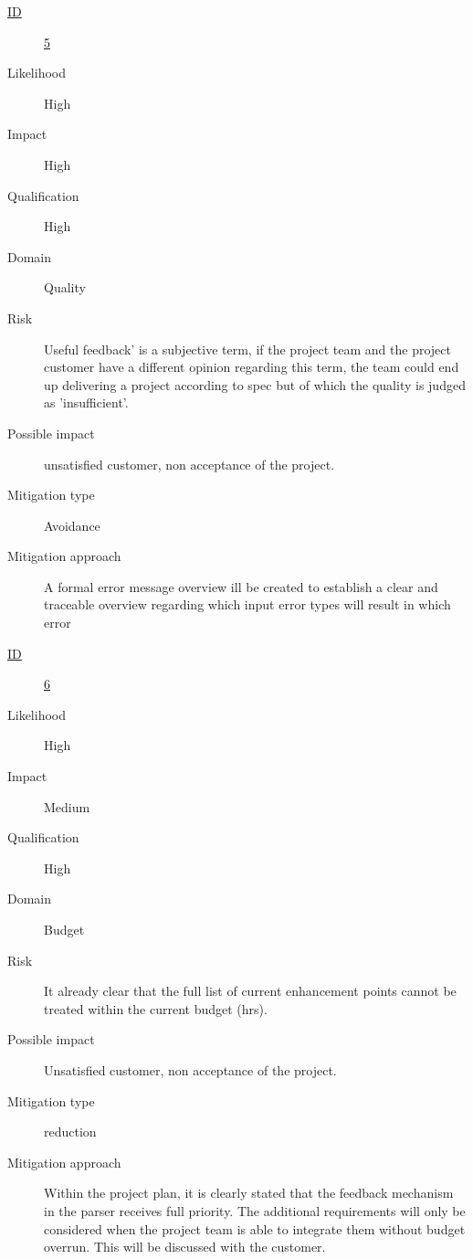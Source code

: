 \begin{description}
	\item [\underline{ID}]
	\underline{5}
	\item[Likelihood]
	High
	\item[Impact]
	High
	\item[Qualification]
	High
	\item[Domain]
	Quality
	\item[Risk]
	Useful feedback' is a subjective term, if the project team and the project customer have a different opinion regarding this term, the team could end up delivering a project according to spec but of which the quality is judged as 'insufficient'.
	\item[Possible impact]
	unsatisfied customer, non acceptance of the project.
	\item[Mitigation type]
	Avoidance
	\item[Mitigation approach]
	A formal error message overview ill be created to establish a clear and traceable overview regarding which input error types will result in which error
\end {description}

\begin{description}
	\item [\underline{ID}]
	\underline{6}
	\item[Likelihood]
	High
	\item[Impact]
	Medium
	\item[Qualification]
	High
	\item[Domain]
	Budget
	\item[Risk]
	It already clear that the full list of current enhancement points cannot be treated within the current budget (hrs).
	\item[Possible impact]
	Unsatisfied customer, non acceptance of the project.
	\item[Mitigation type]
	reduction
	\item[Mitigation approach]
	Within the project plan, it is clearly stated that the feedback mechanism in the parser receives full priority. 
	The additional requirements will only be considered when the project team is able to integrate them without budget overrun. 
	This will be discussed with the customer.
\end {description}

